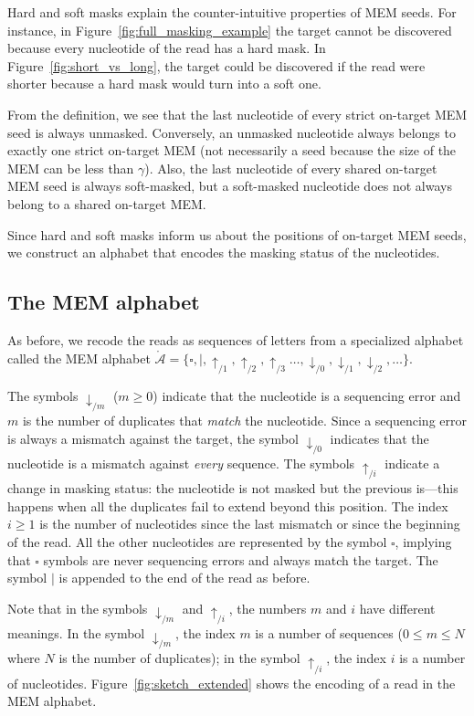 \documentclass{article}
\begin{document}
Hard and soft masks explain the counter-intuitive properties of MEM seeds.
For instance, in Figure~\ref{fig:full_masking_example} the target cannot be
discovered because every nucleotide of the read has a hard mask. In
Figure~\ref{fig:short_vs_long}, the target could be discovered if the read
were shorter because a hard mask would turn into a soft one.

From the definition, we see that the last nucleotide of every strict
on-target MEM seed is always unmasked. Conversely, an unmasked nucleotide
always belongs to exactly one strict on-target MEM (not necessarily a seed
because the size of the MEM can be less than $\gamma$). Also, the last
nucleotide of every shared on-target MEM seed is always soft-masked, but a
soft-masked nucleotide does not always belong to a shared on-target MEM.

Since hard and soft masks inform us about the positions of on-target
MEM seeds, we construct an alphabet that encodes the masking status of the
nucleotides.

\subsection{The MEM alphabet}

As before, we recode the reads as sequences of letters from a specialized
alphabet called the MEM alphabet $\mathring{\mathcal{A}} = \{\square, |,
\uparrow_{/1}, \uparrow_{/2}, \uparrow_{/3} \ldots, \downarrow_{/0},
\downarrow_{/1}, \downarrow_{/2}, \ldots\}$.

The symbols $\downarrow_{/m}$ ($m \geq 0$) indicate that the nucleotide is
a sequencing error and $m$ is the number of duplicates that \emph{match}
the nucleotide. Since a sequencing error is always a mismatch against the
target, the symbol $\downarrow_{/0}$ indicates that the nucleotide is a
mismatch against \emph{every} sequence. The symbols $\uparrow_{/i}$
indicate a change in masking status: the nucleotide is not masked but the
previous is---this happens when all the duplicates fail to extend beyond
this position. The index $i \geq 1$ is the number of nucleotides since the
last mismatch or since the beginning of the read. All the other
nucleotides are represented by the symbol $\square$, implying that
$\square$ symbols are never sequencing errors and always match the
target. The symbol $|$ is appended to the end of the read as before.

Note that in the symbols $\downarrow_{/m}$ and $\uparrow_{/i}$, the
numbers $m$ and $i$ have different meanings. In the symbol
$\downarrow_{/m}$, the index $m$ is a number of sequences ($0 \leq m \leq
N$ where $N$ is the number of duplicates); in the symbol $\uparrow_{/i}$,
the index $i$ is a number of nucleotides. Figure~\ref{fig:sketch_extended}
shows the encoding of a read in the MEM alphabet.
\end{document}
